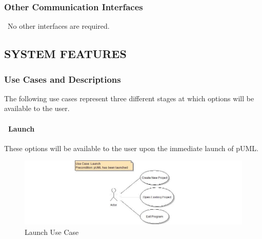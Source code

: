\documentclass[twoside,letterpaper]{article}
\begin{document}
\subsubsection[Other Communication
Interfaces]{\rmfamily\bfseries
Other Communication Interfaces}
{
\foreignlanguage{english}{\ }\foreignlanguage{english}{No other interfaces are required. }}





\clearpage\setcounter{page}{1}\pagestyle{Convertv}

\subsection[SYSTEM FEATURES]{\rmfamily\bfseries
SYSTEM FEATURES}


\subsubsection{Use Cases and Descriptions}
{The following use cases represent three different stages at which options will be available to the user.}

\bigskip
\bigskip

\paragraph[\ Use Category]
{\ Launch} {These options will be available to the user upon the immediate launch of pUML.}

\begin{figure}[h]
\centering
\includegraphics[width=6.0in]{ucaseLaunch.jpg}
\caption{Launch Use Case}
\end{figure}
\end{document}
